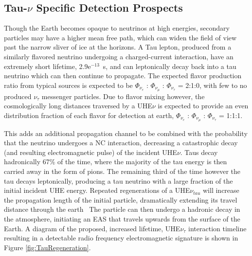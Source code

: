		



	\subsection{Tau-$\nu$ Specific Detection Prospects}
		Though the Earth becomes opaque to neutrinos at high energies, secondary particles may have a higher mean free path, which can widen the field of view past the narrow sliver of ice at the horizons.  A Tau lepton, produced from a similarly flavored neutrino undergoing a charged-current interaction, have an extremely short lifetime, 2.9e$^{-13}$~s, and can leptonically decay back into a tau neutrino which can then continue to propagate.   The expected flavor production ratio from typical sources is expected to be $\Phi_{\nu_{e}}$ : $\Phi_{\nu_{\mu}}$ : $\Phi_{\nu_{\tau}}$ = 2:1:0, with few to no produced $\nu_{\tau}$ messenger particles.  Due to flavor mixing however, the cosmologically long distances traversed by a UHE$\nu$ is expected to provide an even distribution fraction of each flavor for detection at earth, $\Phi_{\nu_{e}}$ : $\Phi_{\nu_{\mu}}$ : $\Phi_{\nu_{\tau}}$ = 1:1:1.  
		
		This adds an additional propagation channel to be combined with the probability that the neutrino undergoes a NC interaction, decreasing a catastrophic decay (and resulting electromagnetic pulse) of the incident UHE$\nu$.  Taus decay hadronically 67\% of the time, where the majority of the tau energy is then carried away in the form of pions.  The remaining third of the time however the tau decays leptonically, producing a tau neutrino with a large fraction of the initial incident UHE energy.  Repeated regenerations of a UHE$\nu_{tau}$ will increase the propagation length of the initial particle, dramatically extending its travel distance through the earth~\cite{TauRegeneration}  The particle can then undergo a hadronic decay in the atmosphere, initiating an EAS that travels upwards from the surface of the Earth.  A diagram of the proposed, increased lifetime, UHE$\nu_{\tau}$ interaction timeline resulting in a detectable radio frequency electromagnetic signature is shown in Figure \ref{fig:TauRegeneration}.
		
